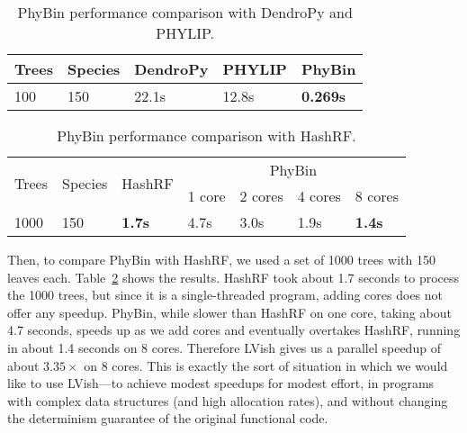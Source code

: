 \begin{table}
\begin{tabularx}{.75\textwidth}{XXXXX}
Trees & Species & DendroPy & PHYLIP & PhyBin    \\ \hline
100   & 150     & 22.1s    & 12.8s  & \textbf{0.269s}
\end{tabularx}
\caption{PhyBin performance comparison with DendroPy and PHYLIP.}
\label{t:phybin-bench}
\end{table}

\begin{table}
\begin{tabularx}{\textwidth}{XXXXXXX}
\multirow{2}{*}{Trees} & \multirow{2}{*}{Species} & \multirow{2}{*}{HashRF} & \multicolumn{4}{c}{PhyBin}                \\
                       &                          &                         & 1 core & 2 cores & 4 cores & 8 cores      \\ \hline
1000                   & 150                      & \textbf{1.7s}           & 4.7s   & 3.0s    & 1.9s    & \textbf{1.4s}
\end{tabularx}
\caption{PhyBin performance comparison with HashRF.}
\label{t:phybin-bench-hashrf}
\end{table}

Then, to compare PhyBin with HashRF, we used a set of 1000 trees with
150 leaves each.  Table~\ref{t:phybin-bench-hashrf} shows the results.
HashRF took about 1.7 seconds to process the 1000 trees, but since it
is a single-threaded program, adding cores does not offer any speedup.
PhyBin, while slower than HashRF on one core, taking about 4.7
seconds, speeds up as we add cores and eventually overtakes HashRF,
running in about 1.4 seconds on 8 cores.  Therefore LVish gives us a
parallel speedup of about $3.35\times$ on 8 cores.  This is exactly
the sort of situation in which we would like to use LVish---to achieve
modest speedups for modest effort, in programs with complex data
structures (and high allocation rates), and without changing the
determinism guarantee of the original functional code.
